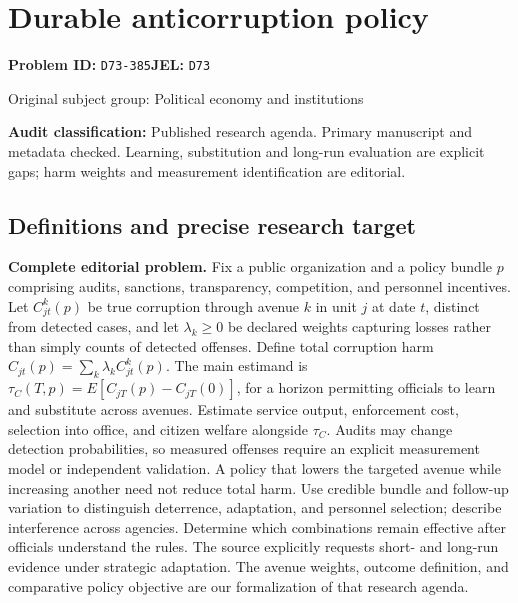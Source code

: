 \documentclass[11pt,a4paper]{article}
\begin{document}
\section*{Durable anticorruption policy}
\textbf{Problem ID:} \texttt{D73-385}\quad \textbf{JEL:} \texttt{D73}\par
\label{problem:OP-0383}
{\sffamily\small\color{muted}Original subject group: Political economy and institutions\par}
\label{definitions:problem:30007665}
\textbf{Audit classification:} Published research agenda. Primary manuscript and metadata checked. Learning, substitution and long-run evaluation are explicit gaps; harm weights and measurement identification are editorial.
\subsection*{Definitions and precise research target}
\textbf{Complete editorial problem.} Fix a public organization and a policy bundle \(p\) comprising audits, sanctions, transparency, competition, and personnel incentives. Let \(C^k_{jt}(p)\) be true corruption through avenue \(k\) in unit \(j\) at date \(t\), distinct from detected cases, and let \(\lambda_k\ge0\) be declared weights capturing losses rather than simply counts of detected offenses. Define total corruption harm \(C_{jt}(p)=\sum_k\lambda_kC^k_{jt}(p)\). The main estimand is \(\tau_C(T,p)=E[C_{jT}(p)-C_{jT}(0)]\), for a horizon permitting officials to learn and substitute across avenues. Estimate service output, enforcement cost, selection into office, and citizen welfare alongside \(\tau_C\). Audits may change detection probabilities, so measured offenses require an explicit measurement model or independent validation. A policy that lowers the targeted avenue while increasing another need not reduce total harm. Use credible bundle and follow-up variation to distinguish deterrence, adaptation, and personnel selection; describe interference across agencies. Determine which combinations remain effective after officials understand the rules. The source explicitly requests short- and long-run evidence under strategic adaptation. The avenue weights, outcome definition, and comparative policy objective are our formalization of that research agenda.
\end{document}
